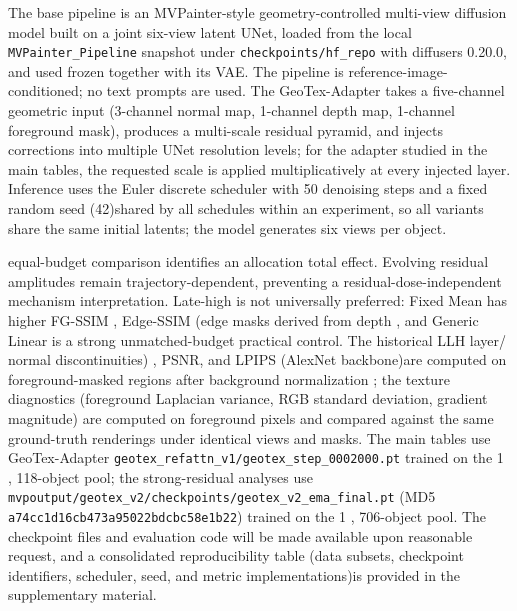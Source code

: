 \documentclass[times,twocolumn,final]{elsarticle}
\providecommand{\DIFadd}[1]{{\protect\color{blue} \sf #1}} %
\providecommand{\DIFdel}[1]{{\protect\color{red} \scriptsize #1}} %
\providecommand{\DIFaddbegin}{} %
\providecommand{\DIFaddend}{} %
\providecommand{\DIFdelbegin}{} %
\providecommand{\DIFdelend}{} %
\begin{document}
\DIFdelbegin \DIFdel{The base pipeline is an MVPainter-style geometry-controlled multi-view diffusion model built on a joint six-view latent UNet, loaded from the local \texttt{MVPainter\_Pipeline} snapshot under \texttt{checkpoints/hf\_repo} with diffusers 0.20.0, and used frozen together with its VAE. The pipeline is reference-image-conditioned; no text prompts are used.
}\DIFdelend The \DIFdelbegin \DIFdel{GeoTex-Adapter takes a five-channel geometric input (3-channel normal map, 1-channel depth map, 1-channel foreground mask), produces a multi-scale residual pyramid, and injects corrections into multiple UNet resolution levels; for the adapter studied in the main tables, the requested scale is applied multiplicatively at every injected layer. Inference uses the Euler discrete scheduler with 50 denoising steps and a fixed random seed (42)shared by all schedules within an experiment, so all variants share the same initial latents; the model generates six views per object.
}%

\DIFdelend \DIFaddbegin \DIFadd{equal-budget comparison identifies an allocation total effect. Evolving residual amplitudes remain trajectory-dependent, preventing a residual-dose-independent mechanism interpretation. Late-high is not universally preferred: Fixed Mean has higher }\DIFaddend FG-SSIM\DIFdelbegin \DIFdel{, Edge-SSIM (edge masks derived from depth}\DIFdelend \DIFaddbegin \DIFadd{, and Generic Linear is a strong unmatched-budget practical control. The historical LLH layer}\DIFaddend /\DIFdelbegin \DIFdel{normal discontinuities) , PSNR, and LPIPS (AlexNet backbone)are computed on foreground-masked regions after background normalization ; the texture diagnostics (foreground Laplacian variance, RGB standard deviation, gradient magnitude) are computed on foreground pixels and compared against the same ground-truth renderings under identical views and masks. The main tables use GeoTex-Adapter \texttt{geotex\_refattn\_v1/geotex\_step\_0002000.pt} trained on the 1}%
\DIFdel{, }%
\DIFdel{118-object pool; the strong-residual analyses use \texttt{mvpoutput/geotex\_v2/checkpoints/geotex\_v2\_ema\_final.pt} (MD5 \texttt{a74cc1d16cb473a95022bdcbc58e1b22}) trained on the 1}%
\DIFdel{,}%
\DIFdel{706-object pool.
The checkpoint files and evaluation code will be made available upon reasonable request, and a consolidated reproducibility table (data subsets, checkpoint identifiers, scheduler, seed, and metric implementations)is provided in the supplementary material. }%
\end{document}
